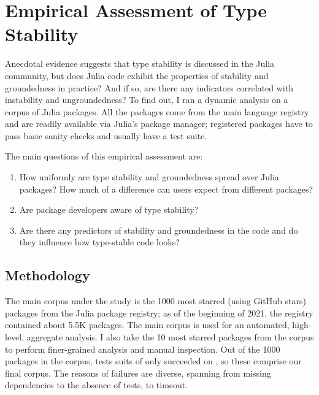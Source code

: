 \documentclass[oneside,openright,titlepage,numbers=noenddot,%
headinclude,footinclude,cleardoublepage=empty,abstract=on,
BCOR=5mm,paper=a4,fontsize=11pt,
dvipsnames
]{scrreprt}
\begin{document}
\section{Empirical Assessment of Type Stability}\label{sec:empirical}

Anecdotal evidence suggests that type stability is discussed in the
Julia community, but does Julia code exhibit the properties of stability
and groundedness in practice? And if so, are there any indicators correlated with
instability and ungroundedness? To find out, I ran a dynamic analysis on a
corpus of Julia packages. All the packages come from the main language registry
and are readily available via Julia's package manager; registered packages have
to pass basic sanity checks and usually have a test suite.

The main questions of this empirical assessment are:
\begin{enumerate}
\item How uniformly are type stability and groundedness spread over Julia packages?
  How much of a difference can users expect from different packages?
\item Are package developers aware of type stability?
\item Are there any predictors of stability and groundedness in the code and do
  they influence how type-stable code looks?
\end{enumerate}

\subsection{Methodology}

The main corpus under the study is the 1000 most starred (using GitHub stars) packages
from the Julia package registry; as of the beginning of 2021, the registry
contained about 5.5K packages. The main corpus is used for an automated,
high-level, aggregate analysis. I also take the 10 most starred packages from
the corpus to perform finer-grained analysis and manual inspection. Out of the
1000 packages in the corpus, tests suits of only \goodpkgsnum succeeded on
\juliaversion, so these \goodpkgsnum comprise our final corpus. The reasons of
failures are diverse, spanning from missing dependencies to the absence of
tests, to timeout.
\end{document}
